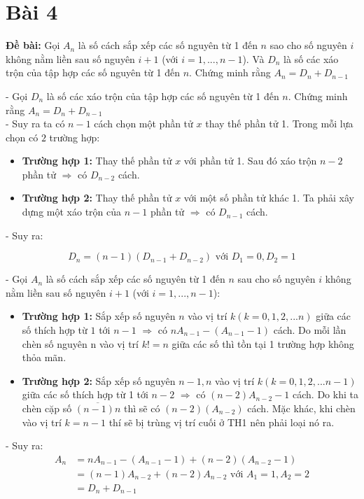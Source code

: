 \documentclass[12pt]{article}
\begin{document}
\begin{sloppypar}
\section{Bài 4}
\begin{tcolorbox}
    \textbf{Đề bài:}  Gọi \(A_{n}\) là số cách sắp xếp các số nguyên từ 1 đến \(n\) sao cho số nguyên \(i\) không nằm liền sau số nguyên \(i+1\) 
    (với \(i=1,...,n-1\)). Và \(D_{n}\) là số các xáo trộn của tập hợp các số nguyên từ 1 đến \(n\). Chứng minh rằng \(A_{n}= D_{n} + D_{n-1}\)
\end{tcolorbox}

- Gọi \(D_{n}\) là số các xáo trộn của tập hợp các số nguyên từ 1 đến \(n\). Chứng minh rằng \(A_{n}= D_{n} + D_{n-1}\) \\
- Suy ra ta có \(n-1\) cách chọn một phần tử \(x\) thay thế phần tử 1. Trong mỗi lựa chọn có \(2\) trường hợp:

\begin{itemize}
    \item \textbf{Trường hợp 1:} Thay thế phần tử \(x\) với phần tử 1. Sau đó xáo trộn \(n-2\) phần tử \(\Rightarrow\) có \(D_{n-2}\) cách. 
    \item \textbf{Trường hợp 2:} Thay thế phần tử \(x\) với một số phần tử khác 1. Ta phải xây dựng một xáo trộn của \(n-1\) phần tử \(\Rightarrow\) có \(D_{n-1}\) cách.
\end{itemize}
- Suy ra:

\begin{equation*}
    D_{n} = (n-1)(D_{n-1} + D_{n-2}) \text{ với } D_{1} = 0, D_{2} = 1
\end{equation*}

- Gọi \(A_{n}\) là số cách sắp xếp các số nguyên từ 1 đến \(n\) sau cho số nguyên \(i\) không nằm liền sau số nguyên \(i+1\) 
(với \(i=1,...,n-1\)): \\

\begin{itemize}
    \item \textbf{Trường hợp 1:} Sắp xếp số nguyên \(n\) vào vị trí \(k (k = 0,1,2,...n)\) giữa các số thích hợp từ \(1\) tới \(n-1\) \(\Rightarrow\) có \(nA_{n-1}-(A_{n-1}-1)\) cách. Do mỗi lần chèn số nguyên n vào vị trí \(k!=n\) giữa các số thì tồn tại 1 trường hợp không thỏa mãn.
    \item \textbf{Trường hợp 2:} Sắp xếp số nguyên \(n-1,n\) vào vị trí \(k(k=0,1,2,...n-1)\) giữa các số thích hợp từ 1 tới \(n-2\) \(\Rightarrow\) có \((n-2)A_{n-2}-1\) cách. Do khi ta chèn cặp số \(\overline{(n-1)n}\) thì sẽ có \((n-2)(A_{n-2})\) cách. Mặc khác, khi chèn vào vị trí \(k=n-1\) thí sẽ bị trùng vị trí cuối ở TH1 nên phải loại nó ra.
\end{itemize}
- Suy ra:
\begin{align*}
    A_{n}   & = nA_{n-1} - (A_{n-1} - 1) + (n-2)(A_{n-2}-1) \\
            & = (n-1)A_{n-2} + (n-2)A_{n-2} \text{ với } A_{1} = 1, A_{2} = 2 \\
            & = D_{n} + D_{n-1}
\end{align*}



\end{sloppypar}
\end{document}
